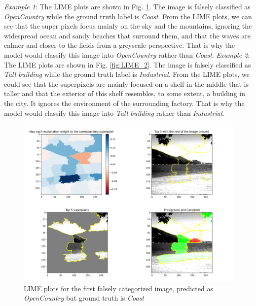 \emph{Example 1}: The LIME plots are shown in Fig. \ref{fig:LIME_1}. The image is falsely classified as \emph{OpenCountry} while the ground truth label is \emph{Coast}. From the LIME plots, we can see that the super pixels focus mainly on the sky and the mountains, ignoring the widespread ocean and sandy beaches that surround them, and that the waves are calmer and closer to the fields from a greyscale perspective. That is why the model would classify this image into \emph{OpenCountry} rather than \emph{Coast}.
\emph{Example 2}: The LIME plots are shown in Fig. \ref{fig:LIME_2}. The image is falsely classified as \emph{Tall building} while the ground truth label is \emph{Industrial}. From the LIME plots, we could see that the superpixels are mainly focused on a shelf in the middle that is taller and that the exterior of this shelf resembles, to some extent, a building in the city. It ignores the environment of the surrounding factory. That is why the model would classify this image into \emph{Tall building} rather than \emph{Industrial}.

\begin{figure}[htbp]
    \centering
    \includegraphics[width=0.85\linewidth]{Lime_1.png}
    \caption{LIME plots for the first falsely categorized image, predicted as \emph{OpenCountry} but ground truth is \emph{Coast}}
    \label{fig:LIME_1}
\end{figure}

